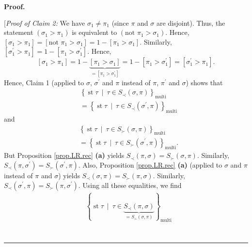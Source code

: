 \documentclass[numbers=enddot,12pt,final,onecolumn,notitlepage]{scrartcl}%
\theoremstyle{definition}
\newenvironment{statement}{\begin{quote}}{\end{quote}}
\newenvironment{proof}[1][Proof]{\noindent\textbf{#1.} }{\ \rule{0.5em}{0.5em}}
\begin{document}
\begin{proof}
\begin{statement}
\end{statement}

[\textit{Proof of Claim 2:} We have $\sigma_{1}\neq\pi_{1}$ (since $\pi$ and
$\sigma$ are disjoint). Thus, the statement $\left(  \sigma_{1}>\pi
_{1}\right)  $ is equivalent to $\left(  \text{not }\pi_{1}>\sigma_{1}\right)
$. Hence, $\left[  \sigma_{1}>\pi_{1}\right]  =\left[  \text{not }\pi
_{1}>\sigma_{1}\right]  =1-\left[  \pi_{1}>\sigma_{1}\right]  $. Similarly,
$\left[  \sigma_{1}^{\prime}>\pi_{1}\right]  =1-\left[  \pi_{1}>\sigma
_{1}^{\prime}\right]  $. Hence,%
\[
\left[  \sigma_{1}>\pi_{1}\right]  =1-\underbrace{\left[  \pi_{1}>\sigma
_{1}\right]  }_{=\left[  \pi_{1}>\sigma_{1}^{\prime}\right]  }=1-\left[
\pi_{1}>\sigma_{1}^{\prime}\right]  =\left[  \sigma_{1}^{\prime}>\pi
_{1}\right]  .
\]
Hence, Claim 1 (applied to $\sigma$, $\sigma^{\prime}$ and $\pi$ instead of
$\pi$, $\pi^{\prime}$ and $\sigma$) shows that%
\begin{align*}
&  \left\{  \operatorname{st} \tau   \ \mid\ \tau\in S_{\prec
}\left(  \sigma,\pi\right)  \right\}  _{\operatorname*{multi}}\\
&  =\left\{  \operatorname{st} \tau   \ \mid\ \tau\in S_{\prec
}\left(  \sigma^{\prime},\pi\right)  \right\}  _{\operatorname*{multi}}%
\end{align*}
and%
\begin{align*}
&  \left\{  \operatorname{st} \tau   \ \mid\ \tau\in S_{\succ
}\left(  \sigma,\pi\right)  \right\}  _{\operatorname*{multi}}\\
&  =\left\{  \operatorname{st} \tau   \ \mid\ \tau\in S_{\succ
}\left(  \sigma^{\prime},\pi\right)  \right\}  _{\operatorname*{multi}}.
\end{align*}
But Proposition \ref{prop.LR.rec} \textbf{(a)} yields $S_{\prec}\left(
\pi,\sigma\right)  =S_{\succ}\left(  \sigma,\pi\right)  $. Similarly,
$S_{\prec}\left(  \pi,\sigma^{\prime}\right)  =S_{\succ}\left(  \sigma
^{\prime},\pi\right)  $. Also, Proposition \ref{prop.LR.rec} \textbf{(a)}
(applied to $\sigma$ and $\pi$ instead of $\pi$ and $\sigma$) yields
$S_{\prec}\left(  \sigma,\pi\right)  =S_{\succ}\left(  \pi,\sigma\right)  $.
Similarly, $S_{\prec}\left(  \sigma^{\prime},\pi\right)  =S_{\succ}\left(
\pi,\sigma^{\prime}\right)  $. Using all these equalities, we find%
\begin{align*}
&  \left\{  \operatorname{st} \tau   \ \mid\ \tau\in
\underbrace{S_{\prec}\left(  \pi,\sigma\right)  }_{=S_{\succ}\left(
\sigma,\pi\right)  }\right\}  _{\operatorname*{multi}}\\

\end{align*}
\end{proof}
\end{document}
